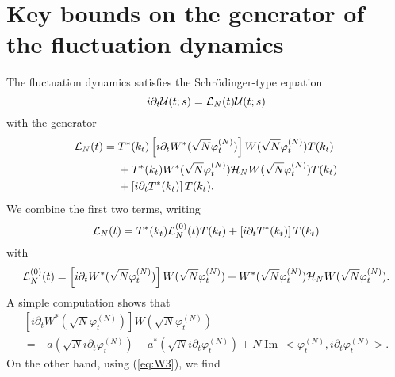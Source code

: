 \documentclass[11pt,a4paper]{article}
\newcommand{\cU}{{\cal U}}
\newcommand{\cH}{{\cal H}}
\newcommand{\cL}{{\cal L}}
\newcommand{\scal}[2]{\big<#1,#2\big>} %
\renewcommand{\Im}{\operatorname{Im}\,} 	%
\begin{document}
\section{Key bounds on the generator of the fluctuation dynamics}
\label{sec:gen-fd}

The fluctuation dynamics satisfies the Schr\"odinger-type equation
\[ i\partial_t \cU (t;s) = \cL_N (t) \cU (t;s) \]
with the generator
\[ \begin{split} \cL_N (t) = \; &T^* (k_t) \left[ i \partial_t W^* (\sqrt{N} \varphi_t^{(N)}) \right] W(\sqrt{N} \varphi_t^{(N)}) T (k_t) \\ &+ T^* (k_t) W^* (\sqrt{N} \varphi_t^{(N)}) \cH_N W (\sqrt{N} \varphi_t^{(N)}) T (k_t) \\ &+ \left[ i \partial_t T^* (k_t) \right] T(k_t).  \end{split} \]
We combine the first two terms, writing
\begin{equation}\label{eq:cLN} \cL_N (t) = T^* (k_t) \cL^{(0)}_N (t) T (k_t) + \left[ i \partial_t T^* (k_t) \right] T(k_t)  
\end{equation}
with 
\[ \cL_N^{(0)} (t) =  \left[ i \partial_t W^* (\sqrt{N} \varphi_t^{(N)}) \right] W(\sqrt{N} \varphi_t^{(N)}) + 
W^* (\sqrt{N} \varphi_t^{(N)}) \cH_N W (\sqrt{N} \varphi_t^{(N)}). \]
A simple computation shows that
\begin{multline*}
 \left[ i \partial_t W^* (\sqrt{N} \varphi_t^{(N)}) \right] W(\sqrt{N}
 \varphi_t^{(N)}) \\= - a(\sqrt{N} i \partial_t \varphi_t^{(N)}) - a^*
 (\sqrt{N} i \partial_t \varphi_t^{(N)}) + N \Im \scal{\varphi_t^{(N)}
 }{i\partial_t \varphi_t^{(N)}}. \end{multline*}
 On the other hand, using (\ref{eq:W3}), we find
\end{document}
